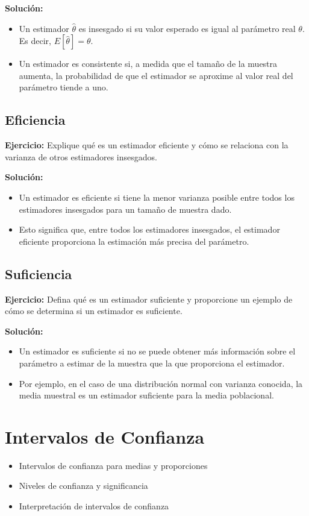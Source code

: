 \documentclass{article}
\begin{document}
\textbf{Solución:}
\begin{itemize}
    \item Un estimador $\hat{\theta}$ es insesgado si su valor esperado es igual al parámetro real $\theta$. Es decir, $E[\hat{\theta}] = \theta$.
    \item Un estimador es consistente si, a medida que el tamaño de la muestra aumenta, la probabilidad de que el estimador se aproxime al valor real del parámetro tiende a uno.
\end{itemize}

\subsection{Eficiencia}

\textbf{Ejercicio:} Explique qué es un estimador eficiente y cómo se relaciona con la varianza de otros estimadores insesgados.

\textbf{Solución:}
\begin{itemize}
    \item Un estimador es eficiente si tiene la menor varianza posible entre todos los estimadores insesgados para un tamaño de muestra dado.
    \item Esto significa que, entre todos los estimadores insesgados, el estimador eficiente proporciona la estimación más precisa del parámetro.
\end{itemize}

\subsection{Suficiencia}

\textbf{Ejercicio:} Defina qué es un estimador suficiente y proporcione un ejemplo de cómo se determina si un estimador es suficiente.

\textbf{Solución:}
\begin{itemize}
    \item Un estimador es suficiente si no se puede obtener más información sobre el parámetro a estimar de la muestra que la que proporciona el estimador.
    \item Por ejemplo, en el caso de una distribución normal con varianza conocida, la media muestral es un estimador suficiente para la media poblacional.
\end{itemize}


\section{Intervalos de Confianza}
\begin{itemize}
    \item Intervalos de confianza para medias y proporciones
    \item Niveles de confianza y significancia
    \item Interpretación de intervalos de confianza
\end{itemize}
\end{document}
